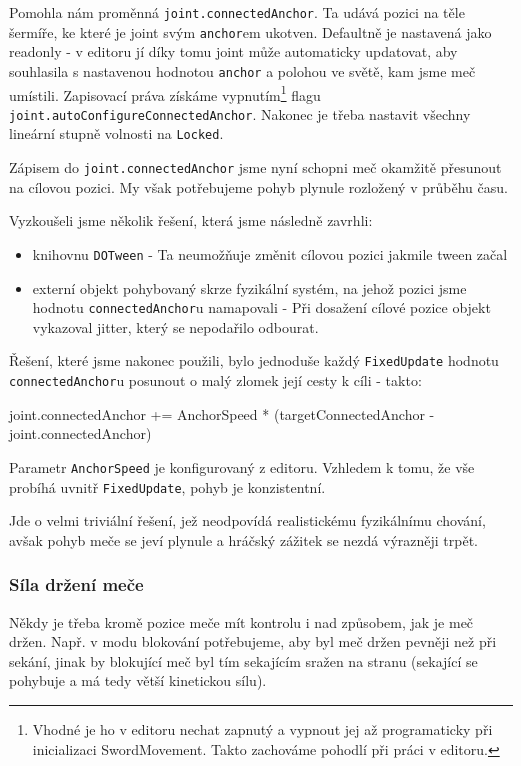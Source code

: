 Pomohla nám proměnná \texttt{joint.connectedAnchor}. Ta udává pozici na těle šermíře, ke které je joint svým \texttt{anchor}em ukotven. Defaultně je nastavená jako readonly - v editoru jí díky tomu joint může automaticky updatovat, aby souhlasila s nastavenou hodnotou \texttt{anchor} a polohou ve světě, kam jsme meč umístili. Zapisovací práva získáme vypnutím\footnote{Vhodné je ho v editoru nechat zapnutý a vypnout jej až programaticky při inicializaci SwordMovement. Takto zachováme pohodlí při práci v editoru.} flagu \texttt{joint.autoConfigureConnectedAnchor}. Nakonec je třeba nastavit všechny lineární stupně volnosti na \texttt{Locked}.

Zápisem do \texttt{joint.connectedAnchor} jsme nyní schopni meč okamžitě přesunout na cílovou pozici. My však potřebujeme pohyb plynule rozložený v průběhu času. 

Vyzkoušeli jsme několik řešení, která jsme následně zavrhli:
\begin{itemize}
  \item knihovnu \texttt{DOTween} - Ta neumožňuje změnit cílovou pozici jakmile tween začal
  \item externí objekt pohybovaný skrze fyzikální systém, na jehož pozici jsme hodnotu \texttt{connectedAnchor}u namapovali - Při dosažení cílové pozice objekt vykazoval jitter, který se nepodařilo odbourat.
\end{itemize}
Řešení, které jsme nakonec použili, bylo jednoduše každý \texttt{FixedUpdate} hodnotu \texttt{connectedAnchor}u posunout o malý zlomek její cesty k cíli - takto: 
\begin{code}
 joint.connectedAnchor += AnchorSpeed *
   (targetConnectedAnchor - joint.connectedAnchor) 
\end{code}
Parametr \texttt{AnchorSpeed} je konfigurovaný z editoru. Vzhledem k tomu, že vše probíhá uvnitř \texttt{FixedUpdate}, pohyb je konzistentní.

Jde o velmi triviální řešení, jež neodpovídá realistickému fyzikálnímu chování, avšak pohyb meče se jeví plynule a hráčský zážitek se nezdá výrazněji trpět.

\subsubsection*{Síla držení meče} \label{implementationSwordHoldingForceSubsubsection}

Někdy je třeba kromě pozice meče mít kontrolu i nad způsobem, jak je meč držen. Např. v modu blokování potřebujeme, aby byl meč držen pevněji než při sekání, jinak by blokující meč byl tím sekajícím sražen na stranu (sekající se pohybuje a má tedy větší kinetickou sílu). 

